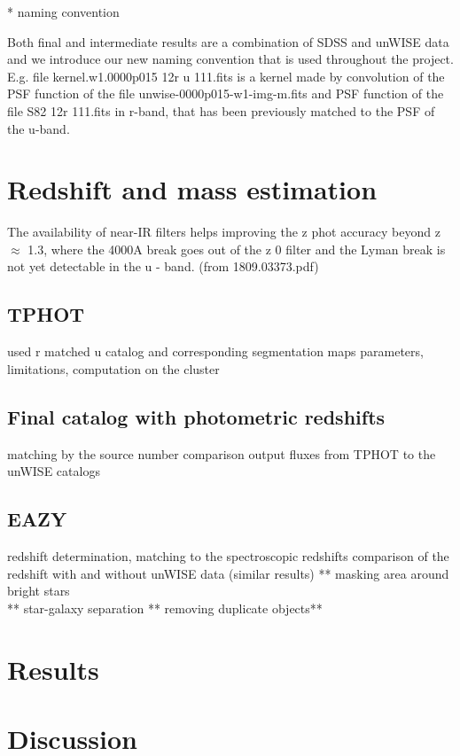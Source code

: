 \documentclass[numberedappendix,apj,twocolumn]{emulateapj}
\begin{document}
* naming convention

Both final and intermediate results are a combination of SDSS and unWISE data and
we introduce our new naming convention that is used throughout the project. E.g. file
kernel.w1.0000p015 12r u 111.fits is a kernel made by convolution of the PSF function
of the file unwise-0000p015-w1-img-m.fits and PSF function of the file S82 12r 111.fits
in r-band, that has been previously matched to the PSF of the u-band.


\section{Redshift and mass estimation}

The availability of near-IR filters helps improving the
z phot accuracy beyond z $\approx$ 1.3, where the 4000A break goes out
of the z 0 filter and the Lyman break is not yet detectable in the
u - band. (from 1809.03373.pdf)

\subsection{TPHOT} 
	used r matched u catalog and corresponding segmentation maps
	parameters, limitations, computation on the cluster 

\subsection{Final catalog with photometric redshifts} 
	matching by the source number
	comparison output fluxes from TPHOT to the unWISE catalogs

\subsection{EAZY} 
	redshift determination, matching to the spectroscopic redshifts
	comparison of the redshift with and without unWISE data (similar results)
** masking area around bright stars\\
** star-galaxy separation
** removing duplicate objects**

	
\section{Results}

\section{Discussion}
\end{document}
